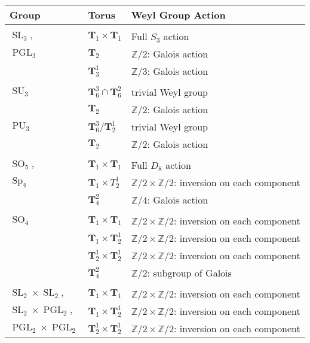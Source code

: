 \documentclass[11pt]{amsart}
\theoremstyle{plain}
\theoremstyle{definition}
\DeclareMathOperator{\PGL}{PGL}
\DeclareMathOperator{\SL}{SL}
\DeclareMathOperator{\SU}{SU}
\DeclareMathOperator{\PU}{PU}
\DeclareMathOperator{\SO}{SO}
\DeclareMathOperator{\Sp}{Sp}
\newcommand{\ZZ}{\mathbb{Z}}
\newcommand{\T}{\mathbf{T}}
\begin{document}
\begin{tabular}{l|l|l}
Group & Torus & Weyl Group Action \\
\hline && \\
$\SL_3,$ & $\T_1 \times \T_1$ & Full $S_3$ action \\
$\PGL_3$ & $\T_2$ & $\ZZ/2$: Galois action \\
& $\T_3^1$ & $\ZZ/3$: Galois action \\
\hline && \\
$\SU_3$ & $\T_6^3 \cap \T_6^2$ & trivial Weyl group \\
& $\T_2$ & $\ZZ/2$: Galois action \\
$\PU_3$ & $\T_6^3 / \T_2^1$ & trivial Weyl group \\
& $\T_2$ & $\ZZ/2$: Galois action \\
\hline && \\
$\SO_5,$ & $\T_1 \times \T_1$ & Full $D_8$ action \\
$\Sp_4$ & $\T_1 \times T_2^1$ & $\ZZ/2 \times \ZZ/2$: inversion on each component \\
& $\T_4^2$ & $\ZZ/4$: Galois action \\
\hline && \\
$\SO_4$ & $\T_1 \times \T_1$ & $\ZZ / 2 \times \ZZ / 2$: inversion on each component \\
& $\T_1 \times \T_2^1$ & $\ZZ / 2 \times \ZZ / 2$: inversion on each component \\
& $\T_2^1 \times \T_2^1$ & $\ZZ / 2 \times \ZZ / 2$: inversion on each component \\
& $\T_4^2$ & $\ZZ / 2$: subgroup of Galois \\
\hline && \\
$\SL_2 \times \SL_2,$ & $\T_1 \times \T_1$ & $\ZZ / 2 \times \ZZ / 2$: inversion on each component \\
$\SL_2 \times \PGL_2,$ & $\T_1 \times \T_2^1$ & $\ZZ / 2 \times \ZZ / 2$: inversion on each component \\
$\PGL_2 \times \PGL_2$ & $\T_2^1 \times \T_2^1$& $\ZZ / 2 \times \ZZ / 2$: inversion on each component
\end{tabular}
\end{document}
